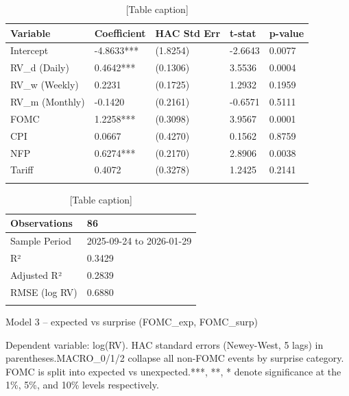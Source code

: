 \documentclass[12pt,a4paper]{report}
\begin{document}
\begin{table}[H]
\centering
\begin{tabular}{|l|l|l|l|l|}
\hline
Variable & Coefficient & HAC Std Err & t-stat & p-value \\
\hline
Intercept & -4.8633*** & (1.8254) & -2.6643 & 0.0077 \\
\hline
RV_d (Daily) & 0.4642*** & (0.1306) & 3.5536 & 0.0004 \\
\hline
RV_w (Weekly) & 0.2231 & (0.1725) & 1.2932 & 0.1959 \\
\hline
RV_m (Monthly) & -0.1420 & (0.2161) & -0.6571 & 0.5111 \\
\hline
FOMC & 1.2258*** & (0.3098) & 3.9567 & 0.0001 \\
\hline
CPI & 0.0667 & (0.4270) & 0.1562 & 0.8759 \\
\hline
NFP & 0.6274*** & (0.2170) & 2.8906 & 0.0038 \\
\hline
Tariff & 0.4072 & (0.3278) & 1.2425 & 0.2141 \\
\hline
 &  &  &  &  \\
\hline
\end{tabular}
\caption{[Table caption]}
\end{table}
\begin{table}[H]
\centering
\begin{tabular}{|l|l|}
\hline
Observations & 86 \\
\hline
Sample Period & 2025-09-24 to 2026-01-29 \\
\hline
R² & 0.3429 \\
\hline
Adjusted R² & 0.2839 \\
\hline
RMSE (log RV) & 0.6880 \\
\hline
 &  \\
\hline
\end{tabular}
\caption{[Table caption]}
\end{table}
Model 3 -- expected vs surprise (FOMC_exp, FOMC_surp)

Dependent variable: log(RV). HAC standard errors (Newey-West, 5 lags) in parentheses.MACRO_0/1/2 collapse all non-FOMC events by surprise category. FOMC is split into expected vs unexpected.***, **, * denote significance at the 1\%, 5\%, and 10\% levels respectively.
\end{document}
